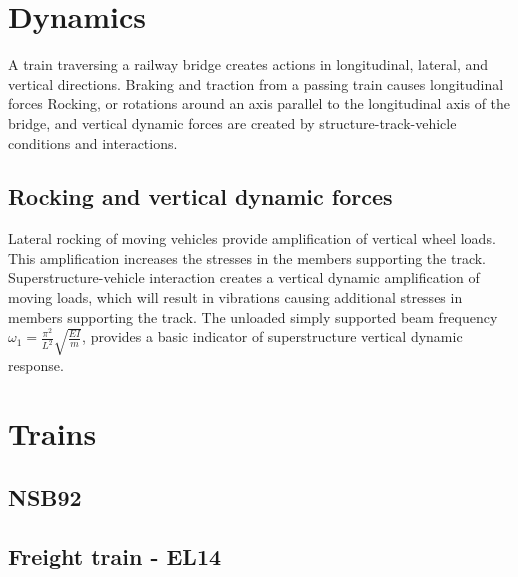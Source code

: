 \chapter{Dynamics}
A train traversing a railway bridge creates actions in longitudinal, lateral, and vertical directions. Braking and traction from a passing train causes longitudinal forces
Rocking, or rotations around an axis parallel to the longitudinal axis of the bridge, and vertical dynamic forces are created by structure-track-vehicle conditions and interactions.
\section{Rocking and vertical dynamic forces}
Lateral rocking of moving vehicles provide amplification of vertical  wheel loads. This amplification increases the stresses in the members supporting the track.
%
Superstructure-vehicle interaction creates a vertical dynamic amplification of moving loads, which will result in vibrations causing additional stresses in members supporting the track.
%
The unloaded simply supported beam frequency $\omega_1 = \frac{\pi^2}{L^2}\sqrt{\frac{EI}{m}}$, provides a basic indicator of superstructure vertical dynamic response.
%
\chapter{Trains}
\section{NSB92}

\section{Freight train - EL14}

